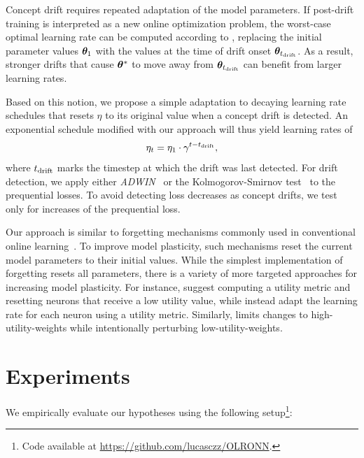 \documentclass{article} %
\begin{document}
Concept drift requires repeated adaptation of the model parameters.
If post-drift training is interpreted as a new online optimization problem, the worst-case optimal learning rate can be computed according to , replacing the initial parameter values ${\bm{\theta}}_1$ with the values at the time of drift onset ${\bm{\theta}}_{t_{\rm{drift}}}$.
As a result, stronger drifts that cause ${\bm{\theta}}^*$ to move away from ${\bm{\theta}}_{t_{\rm{drift}}}$ can benefit from larger learning rates.

Based on this notion, we propose a simple adaptation to decaying learning rate schedules that resets $\eta$ to its original value when a concept drift is detected.
An exponential schedule modified with our approach will thus yield learning rates of
\begin{equation}
   \eta_t = \eta_1 \cdot \gamma^{t-t_{\rm{drift}}},
\end{equation}\label{eq:drift_reset}
where $t_{\rm{drift}}$ marks the timestep at which the drift was last detected.
For drift detection, we apply either \textit{ADWIN}~\citep{bifetLearningTimeChangingData2007} or the Kolmogorov-Smirnov test~\citep{masseyKolmogorovSmirnovTestGoodness1951} to the prequential losses.
To avoid detecting loss decreases as concept drifts, we test only for increases of the prequential loss.

Our approach is similar to forgetting mechanisms commonly used in conventional online learning~\citep{gamaSurveyConceptDrift2014}.
To improve model plasticity, such mechanisms reset the current model parameters to their initial values.
While the simplest implementation of forgetting resets all parameters, there is a variety of more targeted approaches for increasing model plasticity.
For instance, \citet{dohareLossPlasticityDeep2023} suggest computing a utility metric and resetting neurons that receive a low utility value, while \citet{paikOvercomingCatastrophicForgetting2019a} instead adapt the learning rate for each neuron using a utility metric.
Similarly, \citet{elsayedUtilitybasedPerturbedGradient2023} limits changes to high-utility-weights while intentionally perturbing low-utility-weights.


\section{Experiments}\label{sec:experiments}

We empirically evaluate our hypotheses using the following setup\footnote[3]{Code available at \url{https://github.com/lucasczz/OLRONN}.}:
\end{document}
